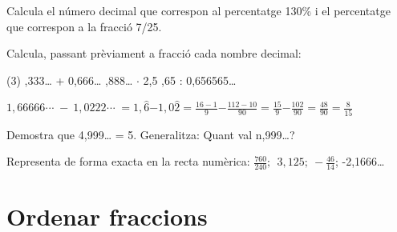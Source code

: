 \begin{mylist}
 
	\exer  Calcula el número decimal que correspon al percentatge 130\% i el percentatge que correspon a la fracció 7/25.


 
\exer[1]  Calcula, passant prèviament a fracció cada nombre decimal: 
 \begin{tasks}(3)
 	,333{\dots} + 0,666{\dots} 
 	,888{\dots} $\cdot$ 2,5
 	,65 : 0,656565{\dots}
 \end{tasks}

\end{mylist}

\begin{example}
 
$\mathrm{1,66666\textrm{·}\textrm{·}\textrm{·}\ -\ 1,0222\textrm{·}\textrm{·}\textrm{·}\ =1,}\widehat{\mathrm{6}}\mathrm{-}\mathrm{1,0}\widehat{\mathrm{2}}\mathrm{=}\frac{\mathrm{16-1}}{\mathrm{9}}\mathrm{-}\frac{\mathrm{112-10}}{\mathrm{90}}\mathrm{=}\frac{\mathrm{15}}{\mathrm{9}}\mathrm{-}\frac{\mathrm{102}}{\mathrm{90}}\mathrm{=}\frac{\mathrm{48}}{\mathrm{90}}\mathrm{=}\frac{\mathrm{8}}{\mathrm{15}}$
\vspace{0.25cm}
\end{example}


\begin{mylist} 
 
	\exer  Demostra que 4,999{\dots} = 5. Generalitza: Quant val n,999{\dots}?
 


 
	\exer  Representa de forma exacta en la recta numèrica: $\frac{760}{240};\ \ 3,125;\ -\frac{46}{14}$; -2,1666{\dots}
	
\end{mylist}

\section{Ordenar fraccions}
 

